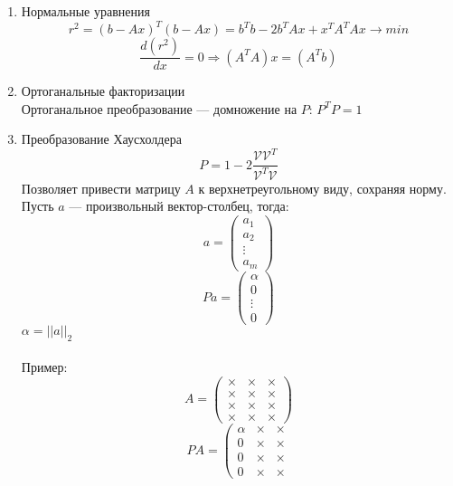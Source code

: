 \begin{enumerate}
    \item Нормальные уравнения
    $$r^{2}=(b-Ax)^{T}(b-Ax)=b^{T}b-2b^{T}Ax+x^{T}A^{T}Ax\longrightarrow min$$
    $$\frac{d(r^{2})}{dx}=0\Longrightarrow (A^{T}A)x=(A^{T}b)$$
    \item Ортоганальные факторизации\\
    Ортоганальное преобразование --- домножение на $P$: $P^{T}P=1$
    \item Преобразование Хаусхолдера
    $$P=1-2\frac{\mathcal{V}\mathcal{V}^{T}}{\mathcal{V}^{T}\mathcal{V}}$$
    Позволяет привести матрицу $A$ к верхнетреугольному виду, сохраняя норму.\\
    Пусть $a$ --- произвольный вектор-столбец, тогда:
    \begin{equation*}
    a = \left(
    \begin{array}{cccc}
    a_{1}\\
    a_{2}\\
    \vdots\\
    a_{m}
    \end{array}
    \right)
    \end{equation*}
    \begin{equation*}
    Pa = \left(
    \begin{array}{cccc}
    \alpha\\
    0\\
    \vdots\\
    0
    \end{array}
    \right)
    \end{equation*}
    $\alpha=||a||_{2}$\\\\
    Пример:
\begin{equation*}
A = \left(
\begin{array}{cccc}
\times & \times & \times \\
\times & \times & \times \\
\times & \times & \times \\
\times & \times & \times
\end{array}
\right)
\end{equation*}
\begin{equation*}
PA = \left(
\begin{array}{cccc}
\alpha & \times & \times \\
0 & \times & \times \\
0 & \times & \times \\
0 & \times & \times
\end{array}

\end{equation*}
\end{enumerate}
